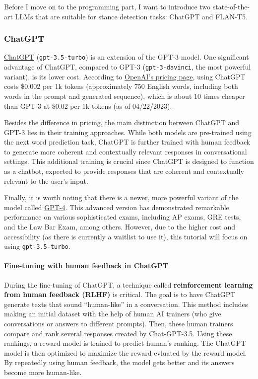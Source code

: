 \documentclass[11pt]{article}
\begin{document}
Before I move on to the programming part, I want to introduce two
state-of-the-art LLMs that are suitable for stance detection tasks:
ChatGPT and FLAN-T5.

\hypertarget{chatgpt}{%
\subsubsection{ChatGPT}\label{chatgpt}}

\href{https://openai.com/blog/chatgpt}{ChatGPT} (\texttt{gpt-3.5-turbo})
is an extension of the GPT-3 model. One significant advantage of
ChatGPT, compared to GPT-3 (\texttt{gpt-3-davinci}, the most powerful
variant), is its lower cost. According to
\href{https://openai.com/pricing/}{OpenAI's pricing page}, using ChatGPT
costs \$0.002 per 1k tokens (approximately 750 English words, including
both words in the prompt and generated sequence), which is about 10
times cheaper than GPT-3 at \$0.02 per 1k tokens (as of 04/22/2023).

Besides the difference in pricing, the main distinction between ChatGPT
and GPT-3 lies in their training approaches. While both models are
pre-trained using the next word prediction task, ChatGPT is further
trained with human feedback to generate more coherent and contextually
relevant responses in conversational settings. This additional training
is crucial since ChatGPT is designed to function as a chatbot, expected
to provide responses that are coherent and contextually relevant to the
user's input.

Finally, it is worth noting that there is a newer, more powerful variant
of the model called \href{https://openai.com/research/gpt-4}{GPT-4}.
This advanced version has demonstrated remarkable performance on various
sophisticated exams, including AP exams, GRE tests, and the Law Bar
Exam, among others. However, due to the higher cost and accessibility
(as there is currently a waitlist to use it), this tutorial will focus
on using \texttt{gpt-3.5-turbo}.

    \hypertarget{fine-tuning-with-human-feedback-in-chatgpt}{%
\paragraph{Fine-tuning with human feedback in
ChatGPT}\label{fine-tuning-with-human-feedback-in-chatgpt}}

During the fine-tuning of ChatGPT, a technique called
\textbf{reinforcement learning from human feedback (RLHF)} is critical.
The goal is to have ChatGPT generate texts that sound ``human-like'' in
a conversation. This method includes making an initial dataset with the
help of human AI trainers (who give conversations or answers to
different prompts). Then, these human trainers compare and rank several
responses created by Chat-GPT-3.5. Using these rankings, a reward model
is trained to predict human's ranking. The ChatGPT model is then
optimized to maximize the reward evluated by the reward model. By
repeatedly using human feedback, the model gets better and its answers
become more human-like.
\end{document}
